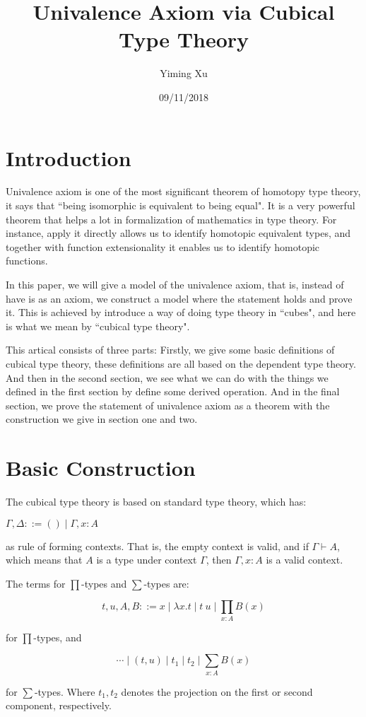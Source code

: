 \documentclass[11pt]{article}
\title{Univalence Axiom via Cubical Type Theory}
\author{Yiming Xu}
\date{09/11/2018}
\begin{document}
\maketitle
\section{Introduction}
Univalence axiom is one of the most significant theorem of homotopy type theory, it says that ``being isomorphic is equivalent to being equal". It is a very powerful theorem that helps a lot in formalization of mathematics in type theory. For instance, apply it directly allows us to identify homotopic equivalent types, and together with function extensionality it enables us to identify homotopic functions.

In this paper, we will give a model of the univalence axiom, that is, instead of have is as an axiom, we construct a model where the statement holds and prove it. This is achieved by introduce a way of doing type theory in ``cubes", and here is what we mean by ``cubical type theory".

This artical consists of three parts: Firstly, we give some basic definitions of cubical type theory, these definitions are all based on the dependent type theory. And then in the second section, we see what we can do with the things we defined in the first section by define some derived operation. And in the final section, we prove the statement of univalence axiom as a theorem with the construction we give in section one and two.

\section{Basic Construction}
The cubical type theory is based on standard type theory, which has:

$\Gamma,\Delta ::= () \mid \Gamma,x:A$

as rule of forming contexts. That is, the empty context is valid, and if $\Gamma\vdash A$, which means that $A$ is a type under context $\Gamma$, then $\Gamma,x:A$ is a valid context.

The terms for $\prod$-types and $\sum$-types are:

$$t,u,A,B ::= x \mid \lambda x.t\mid t \ u \mid \prod_{x: A}B(x) $$ 

for $\prod$-types, and

$$\cdots\mid (t,u)\mid t_1\mid t_2\mid\sum_{x:A}B(x)$$

for $\sum$-types. Where $t_1,t_2$ denotes the projection on the first or second component, respectively.
\end{document}
